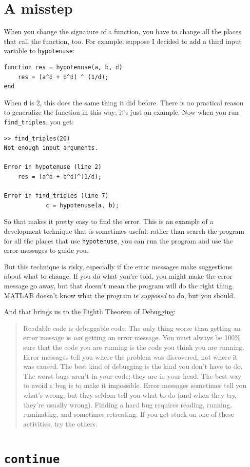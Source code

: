 \documentclass[
]{book}
\newcommand{\displaythrm}[1]{%
    \ifthenelse{\equal{#1}{1}}%
        {Readable code is debuggable code.}{%
    \ifthenelse{\equal{#1}{2}}%
        {The only thing worse than getting an error message is {\em
         not} getting an error message.}{%
    \ifthenelse{\equal{#1}{3}}%
        {You must always be 100\% sure that the code you are running
         is the code you think you are running.}{%
    \ifthenelse{\equal{#1}{4}}%
        {Error messages tell you where the problem was discovered,
         not where it was caused.}{%
    \ifthenelse{\equal{#1}{5}}%
        {The best kind of debugging is the kind you don't have to do.}{%
    \ifthenelse{\equal{#1}{6}}%
        {The worst bugs aren't in your code; they are in your head.}{%
    \ifthenelse{\equal{#1}{7}}%
        {The best way to avoid a bug is to make it impossible.}{%
    \ifthenelse{\equal{#1}{8}}%
        {Error messages sometimes tell you what's wrong, but they
         seldom tell you what to do (and when they try, they're usually
         wrong).}{%
    \ifthenelse{\equal{#1}{9}}%
        {Finding a hard bug requires reading, running, ruminating,
         and sometimes retreating.  If you get stuck on one of these
         activities, try the others.}{%
    {}%
}}}}}}}}}}%
\begin{document}
\section{A misstep}

When you change the signature of a function, you have to change all
the places that call the function, too.  For example, suppose
I decided to add a third input variable to {\tt hypotenuse}:

\begin{verbatim}
function res = hypotenuse(a, b, d)
    res = (a^d + b^d) ^ (1/d);
end
\end{verbatim}

When {\tt d} is 2, this does the same thing it did before.  There is
no practical reason to generalize the function in this way; it's just
an example.  Now when you run {\tt find\_triples}, you get:

\begin{verbatim}
>> find_triples(20)
Not enough input arguments.

Error in hypotenuse (line 2)
    res = (a^d + b^d)^(1/d);

Error in find_triples (line 7)
            c = hypotenuse(a, b);
\end{verbatim}

So that makes it pretty easy to find the error.  This is an example of
a development technique that is sometimes useful: rather
than search the program for all the places that use {\tt hypotenuse},
you can run the program and use the error messages to guide you.

But this technique is risky, especially if the error messages make
suggestions about what to change.  If you do what you're told, you
might make the error message go away, but that doesn't mean the
program will do the right thing.  MATLAB doesn't know what the program
is {\em supposed} to do, but you should.

And that brings us to the Eighth Theorem of Debugging:

\begin{quote}
\displaythrm{8}
\end{quote}


\section{{\tt continue}}
\end{document}
